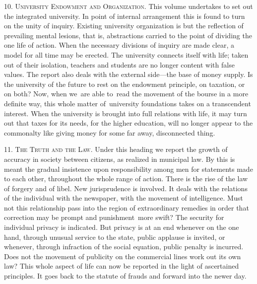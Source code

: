 \documentclass[openany,nobib]{tufte-book}
\begin{document}
10. \textsc{University Endowment and Organization}. This volume undertakes to set
out the integrated university. In point of internal arrangement this is
found to turn on the unity of inquiry. Existing university organization
is but the reflection of prevailing mental lesions, that is,
abstractions carried to the point of dividing the one life of action.
When the necessary divisions of inquiry are made clear, a model for all
time may be erected. The university connects itself with life; taken out
of their isolation, teachers and students are no longer content with
false values. The report also deals with the external side---the base of
money supply. Is the university of the future to rest on the endowment
principle, on taxation, or on both? Now, when we~are able to~read the
movement of the bourse in a more definite way, this whole matter
of~university foundations takes on a transcendent interest. When the
university is brought into full relations with life, it may turn out
that taxes for its needs, for the higher education, will no longer
appear to the commonalty like giving money for some far away,
disconnected thing.~

\vspace{0.05in}

11. \textsc{The Truth and the Law}. Under this heading we report the growth of
accuracy in society between citizens, as realized in municipal law. By
this is meant the gradual insistence upon responsibility among men for
statements made to each other, throughout the whole range of action.
There is the rise of the law of forgery and of libel. New jurisprudence
is involved. It deals with the relations of the individual with the
newspaper, with the movement of intelligence. Must not this relationship
pass into the region of extraordinary remedies in order that correction
may be prompt and punishment~more swift? The security for individual
privacy is indicated. But privacy is at an end whenever on the one hand,
through unusual service to the state, public applause is invited, or
whenever, through infraction of the social equation, public penalty is
incurred. Does not the movement of publicity on the commercial lines
work out its own law? This whole aspect of life can now be reported in
the light of ascertained principles. It goes back to the statute of
frauds and forward into the newer day.~

\vspace{0.05in}
\end{document}
